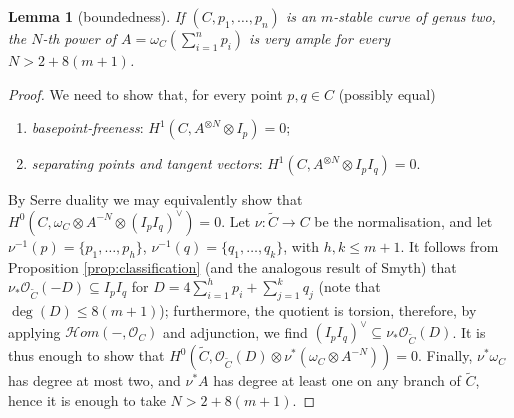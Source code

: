 \documentclass[11pt]{amsart}
\newcommand{\OO}{\mathcal O}
\renewcommand{\to}{\rightarrow}
\newcommand{\hhom}{\mathcal{H}\!om}
\theoremstyle{plain}
\newtheorem{lem}[thm]{Lemma}
\theoremstyle{definition}
\begin{document}
\begin{lem}[boundedness]
 If $(C,p_1,\ldots,p_n)$ is an $m$-stable curve of genus two, the $N$-th power of $A=\omega_C(\sum_{i=1}^np_i)$ is very ample for every $N>2+8(m+1)$.
\end{lem}
\begin{proof}
 We need to show that, for every point $p,q\in C$ (possibly equal)
 \begin{enumerate}
  \item \emph{basepoint-freeness}: $H^1(C,A^{\otimes N}\otimes I_p)=0$;
  \item \emph{separating points and tangent vectors}: $H^1(C,A^{\otimes N}\otimes I_pI_q)=0$.
 \end{enumerate}
By Serre duality we may equivalently show that $H^0(C,\omega_C\otimes A^{-N}\otimes(I_pI_q)^\vee)=0$. Let $\nu\colon\tilde C\to C$ be the normalisation, and let $\nu^{-1}(p)=\{p_1,\ldots,p_h\}$, $\nu^{-1}(q)=\{q_1,\ldots,q_k\}$, with $h,k\leq m+1$. It follows from Proposition \ref{prop:classification} (and the analogous result of Smyth) that $\nu_*\OO_{\tilde C}(-D)\subseteq I_pI_q$ for $D=4\sum_{i=1}^hp_i+\sum_{j=1}^kq_j$ (note that $\deg(D)\leq 8(m+1)$); furthermore, the quotient is torsion, therefore, by applying $\hhom(-,\OO_C)$ and adjunction, we find $(I_pI_q)^\vee\subseteq\nu_*\OO_{\tilde C}(D)$. It is thus enough to show that $H^0(\tilde C,\OO_{\tilde C}(D)\otimes\nu^*(\omega_C\otimes A^{-N}))=0$. Finally, $\nu^*\omega_C$ has degree at most two, and $\nu^*A$ has degree at least one on any branch of $\tilde C$, hence it is enough to take $N>2+8(m+1)$.
\end{proof}
\end{document}
